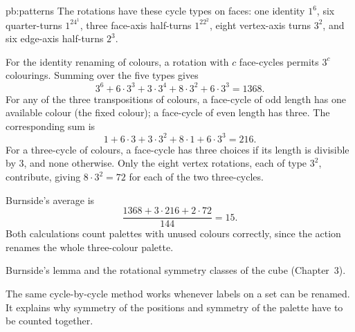 \begin{solution}{pb:patterns}
The rotations have these cycle types on faces: one identity $1^6$, six quarter-turns $1^24^1$, three face-axis half-turns $1^22^2$, eight vertex-axis turns $3^2$, and six edge-axis half-turns $2^3$.

For the identity renaming of colours, a rotation with $c$ face-cycles permits $3^c$ colourings. Summing over the five types gives
\[
3^6+6\cdot3^3+3\cdot3^4+8\cdot3^2+6\cdot3^3=1368.
\]
For any of the three transpositions of colours, a face-cycle of odd length has one available colour (the fixed colour); a face-cycle of even length has three. The corresponding sum is
\[
1+6\cdot3+3\cdot3^2+8\cdot1+6\cdot3^3=216.
\]
For a three-cycle of colours, a face-cycle has three choices if its length is divisible by $3$, and none otherwise. Only the eight vertex rotations, each of type $3^2$, contribute, giving $8\cdot3^2=72$ for each of the two three-cycles.

Burnside's average is
\[
\boxed{\frac{1368+3\cdot216+2\cdot72}{144}=15}.
\]
Both calculations count palettes with unused colours correctly, since the action renames the whole three-colour palette.

\tools Burnside's lemma and the rotational symmetry classes of the cube (Chapter~3).

\leads The same cycle-by-cycle method works whenever labels on a set can be renamed. It explains why symmetry of the positions and symmetry of the palette have to be counted together.
\end{solution}

